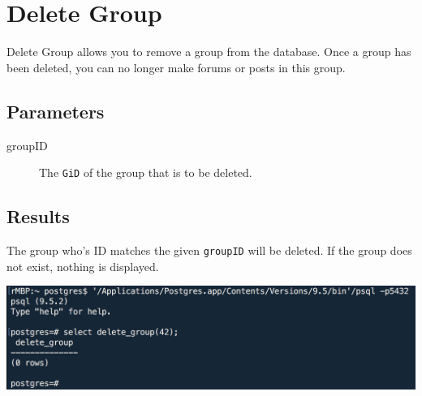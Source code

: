 \section{Delete Group}
Delete Group allows you to remove a group from the database. Once a group has been deleted, you can no longer make forums or posts in this group.

\subsection*{Parameters}
\begin{description}
    \item [groupID] The \texttt{GiD} of the group that is to be deleted.
\end{description}

\subsection*{Results}
The group who's ID matches the given \texttt{groupID} will be deleted. If the group does not exist, nothing is displayed.

\begin{center}
\includegraphics[width=\columnwidth]{include/assets/screenshots/delete_group}
\end{center}




